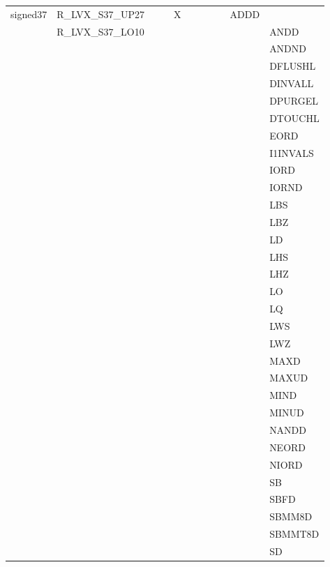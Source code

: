 {\begin{tabular}{|l|l|l|l|l|l|l|l|l|l|l|}
\hline
\textsf{signed37} & \textsf{R\_LVX\_S37\_UP27} & \textsf{} & \textsf{} & \textsf{X} & \textsf{} & \textsf{} & \textsf{} & \textsf{} & \textsf{ADDD} \\
 & \textsf{R\_LVX\_S37\_LO10} & & & & & & & & & \textsf{ANDD} \\
 & & & & & & & & & & \textsf{ANDND} \\
 & & & & & & & & & & \textsf{DFLUSHL} \\
 & & & & & & & & & & \textsf{DINVALL} \\
 & & & & & & & & & & \textsf{DPURGEL} \\
 & & & & & & & & & & \textsf{DTOUCHL} \\
 & & & & & & & & & & \textsf{EORD} \\
 & & & & & & & & & & \textsf{I1INVALS} \\
 & & & & & & & & & & \textsf{IORD} \\
 & & & & & & & & & & \textsf{IORND} \\
 & & & & & & & & & & \textsf{LBS} \\
 & & & & & & & & & & \textsf{LBZ} \\
 & & & & & & & & & & \textsf{LD} \\
 & & & & & & & & & & \textsf{LHS} \\
 & & & & & & & & & & \textsf{LHZ} \\
 & & & & & & & & & & \textsf{LO} \\
 & & & & & & & & & & \textsf{LQ} \\
 & & & & & & & & & & \textsf{LWS} \\
 & & & & & & & & & & \textsf{LWZ} \\
 & & & & & & & & & & \textsf{MAXD} \\
 & & & & & & & & & & \textsf{MAXUD} \\
 & & & & & & & & & & \textsf{MIND} \\
 & & & & & & & & & & \textsf{MINUD} \\
 & & & & & & & & & & \textsf{NANDD} \\
 & & & & & & & & & & \textsf{NEORD} \\
 & & & & & & & & & & \textsf{NIORD} \\
 & & & & & & & & & & \textsf{SB} \\
 & & & & & & & & & & \textsf{SBFD} \\
 & & & & & & & & & & \textsf{SBMM8D} \\
 & & & & & & & & & & \textsf{SBMMT8D} \\
 & & & & & & & & & & \textsf{SD} \\

\end{tabular}}
